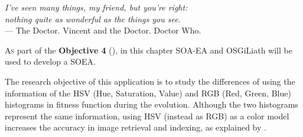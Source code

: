 \label{chap:art}


\begin{flushright}{\slshape
    I've seen many things, my friend, but you're right:
    \\nothing quite as wonderful as the things you see.} \\ \medskip
    --- {The Doctor. Vincent and the Doctor. Doctor Who.}
\end{flushright}


\minitoc\mtcskip
\vfill




\lettrine{A}{s} part of the \textbf{Objective 4} (\objectiveresearch),
in this chapter SOA-EA and OSGiLiath will be used to develop a SOEA.  

The research objective of this application is to study the differences %
of using the information of the HSV (Hue, Saturation, Value) and RGB (Red,
Green, Blue) histograms in fitness function during the evolution. Although the two
histograms represent the same information, using HSV (instead as RGB)
as a color model increases the accuracy in image retrieval and
indexing, as explained by 
\cite{COLORDIFFERENCES}.











